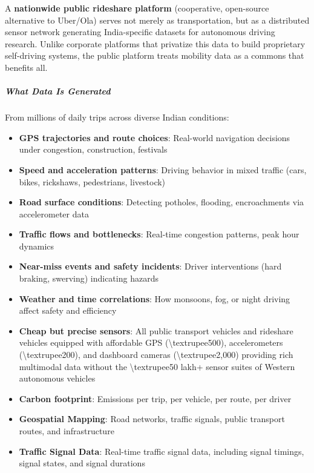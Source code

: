 A \textbf{nationwide public rideshare platform} (cooperative,
open-source alternative to Uber/Ola) serves not merely as
transportation, but as a distributed sensor network generating
India-specific datasets for autonomous driving research. Unlike
corporate platforms that privatize this data to build proprietary
self-driving systems, the public platform treats mobility data as a
commons that benefits all.

\subparagraph{What Data Is Generated}\label{what-data-is-generated}

From millions of daily trips across diverse Indian conditions:

\begin{itemize}
\tightlist
\item
  \textbf{GPS trajectories and route choices}: Real-world navigation
  decisions under congestion, construction, festivals
\item
  \textbf{Speed and acceleration patterns}: Driving behavior in mixed
  traffic (cars, bikes, rickshaws, pedestrians, livestock)
\item
  \textbf{Road surface conditions}: Detecting potholes, flooding,
  encroachments via accelerometer data
\item
  \textbf{Traffic flows and bottlenecks}: Real-time congestion patterns,
  peak hour dynamics
\item
  \textbf{Near-miss events and safety incidents}: Driver interventions
  (hard braking, swerving) indicating hazards
\item
  \textbf{Weather and time correlations}: How monsoons, fog, or night
  driving affect safety and efficiency
\item
  \textbf{Cheap but precise sensors}: All public transport vehicles and
  rideshare vehicles equipped with affordable GPS
  (\textbackslash textrupee500), accelerometers
  (\textbackslash textrupee200), and dashboard cameras
  (\textbackslash textrupee2,000) providing rich multimodal data without
  the \textbackslash textrupee50 lakh+ sensor suites of Western
  autonomous vehicles
\item
  \textbf{Carbon footprint}: Emissions per trip, per vehicle, per route,
  per driver
\item
  \textbf{Geospatial Mapping}: Road networks, traffic signals, public
  transport routes, and infrastructure
\item
  \textbf{Traffic Signal Data}: Real-time traffic signal data, including
  signal timings, signal states, and signal durations
\end{itemize}

